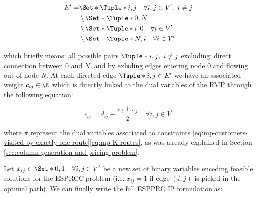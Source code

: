 \begin{equation}
	\begin{aligned}
		E^\prime = & \Set*{\Tuple*{i, j} \quad \forall i, j \in V^\prime,\ i \ne j } \\
		           & \setminus \Set*{ \Tuple*{0, N} }                                \\
		           & \setminus \Set*{ \Tuple*{i, 0} \quad \forall i \in V^\prime }   \\
		           & \setminus \Set*{ \Tuple*{N, i} \quad \forall i \in V^\prime }   \\
	\end{aligned}
\end{equation}

which briefly means: all possible pairs $\Tuple*{i, j},\ i \ne j$ excluding: direct connection between $0$ and $N$, and by exluding edges entering node $0$ and flowing out of node $N$.
At each directed edge $\Tuple*{i, j} \in E^\prime$ we have an associated weight $\bar{c_{ij}} \in \R$ which is directly linked to the dual variables of the RMP through the following equation:

\begin{equation}
	\bar{c_{ij}} = d_{ij} - \frac{\pi_i + \pi_j}{2} \quad \forall i, j \in V^\prime
\end{equation}

where $\pi$ represent the dual variables associated to constraints \eqref{eq:mp-customers-visited-by-exactly-one-route}\eqref{eq:mp-K-routes},
as was already explained in Section \ref{sec:column-generation-and-pricing-problem}.

Let $x_{ij} \in \Set*{0, 1} \quad \forall i, j \in V^\prime$ be a new set of binary variables
encoding feasible solutions for the ESPRCC problem (i.e. $x_{ij} = 1$ if edge $(i, j)$ is picked in the optimal path).
We can finally write the full ESPPRC IP formulation as:

